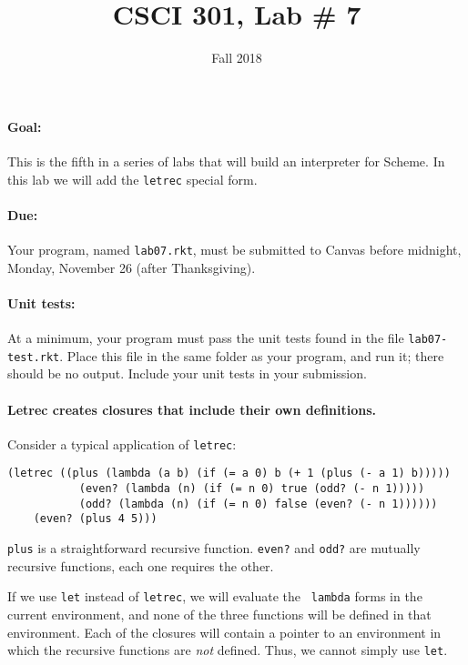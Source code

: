 \documentclass{article}
\title{CSCI 301, Lab \# 7}
\author{Fall 2018}
\date{}
\begin{document}
\maketitle


\paragraph{Goal:} This is the fifth in a series of labs that will
build an interpreter for Scheme.  In this lab we will add the {\tt letrec}
special form.

\paragraph{Due:} Your program, named {\tt lab07.rkt}, must be submitted to
Canvas before midnight, Monday, November 26 (after Thanksgiving).

\paragraph{Unit tests:}
At a minimum, your program must pass the unit tests found in the
file {\tt lab07-test.rkt}.  Place this file in the same folder
as your program, and run it;  there should be no output.  Include
your unit tests in your submission.

\paragraph{Letrec creates closures that include their own definitions.}

Consider a typical application of {\tt letrec}:
\begin{Verbatim}[frame=single]
  (letrec ((plus (lambda (a b) (if (= a 0) b (+ 1 (plus (- a 1) b)))))
           (even? (lambda (n) (if (= n 0) true (odd? (- n 1)))))
           (odd? (lambda (n) (if (= n 0) false (even? (- n 1))))))
    (even? (plus 4 5)))
\end{Verbatim}
{\tt plus} is a straightforward recursive function.  {\tt even?} and
{\tt odd?} are mutually recursive functions, each one requires the
other.

If we use {\tt let} instead of {\tt letrec}, we will evaluate the {\tt
  lambda} forms in the current environment, and none of the three
functions will be defined in that environment.  Each of the closures
will contain a pointer to an environment in which the recursive
functions are {\em not} defined.  Thus, we cannot simply
use {\tt let}.
\end{document}
